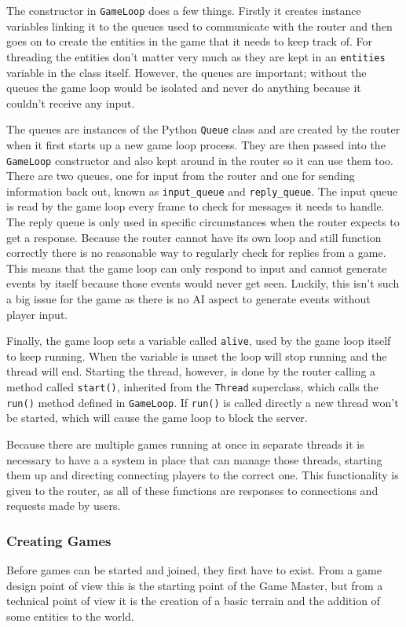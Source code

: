 The constructor in \texttt{GameLoop} does a few things. Firstly it creates instance variables linking it to the queues used to communicate with the router and then goes on to create the entities in the game that it needs to keep track of. For threading the entities don't matter very much as they are kept in an \texttt{entities} variable in the class itself. However, the queues are important; without the queues the game loop would be isolated and never do anything because it couldn't receive any input.

The queues are instances of the Python \texttt{Queue} class and are created by the router when it first starts up a new game loop process. They are then passed into the \texttt{GameLoop} constructor and also kept around in the router so it can use them too. There are two queues, one for input from the router and one for sending information back out, known as \texttt{input\_queue} and \texttt{reply\_queue}. The input queue is read by the game loop every frame to check for messages it needs to handle. The reply queue is only used in specific circumstances when the router expects to get a response. Because the router cannot have its own loop and still function correctly there is no reasonable way to regularly check for replies from a game. This means that the game loop can only respond to input and cannot generate events by itself because those events would never get seen. Luckily, this isn't such a big issue for the game as there is no AI aspect to generate events without player input.

Finally, the game loop sets a variable called \texttt{alive}, used by the game loop itself to keep running. When the variable is unset the loop will stop running and the thread will end. Starting the thread, however, is done by the router calling a method called \texttt{start()}, inherited from the \texttt{Thread} superclass, which calls the \texttt{run()} method defined in \texttt{GameLoop}.  If \texttt{run()} is called directly a new thread won't be started, which will cause the game loop to block the server.

Because there are multiple games running at once in separate threads it is necessary to have a a system in place that can manage those threads, starting them up and directing connecting players to the correct one. This functionality is given to the router, as all of these functions are responses to connections and requests made by users.

\subsubsection{Creating Games}
Before games can be started and joined, they first have to exist. From a game design point of view this is the starting point of the Game Master, but from a technical point of view it is the creation of a basic terrain and the addition of some entities to the world.

